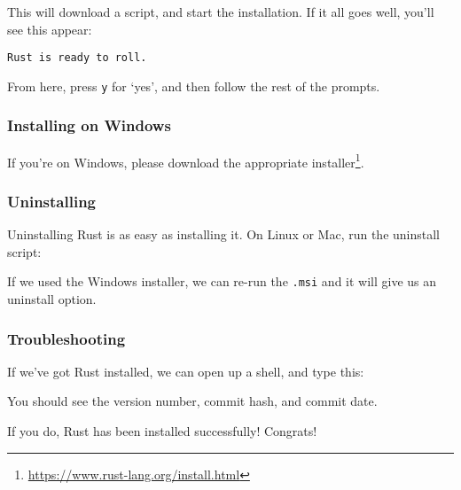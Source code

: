 \documentclass[a4paper,]{book}
\newenvironment{Shaded}{\begin{snugshade}}{\end{snugshade}}
\newcommand{\KeywordTok}[1]{\textcolor[rgb]{0.13,0.29,0.53}{\textbf{{#1}}}}
\newcommand{\NormalTok}[1]{{#1}}
\renewcommand{\href}[2]{#2\footnote{\url{#1}}}
\begin{document}
This will download a script, and start the installation. If it all goes
well, you'll see this appear:

\begin{verbatim}
Rust is ready to roll.
\end{verbatim}

From here, press \texttt{y} for `yes', and then follow the rest of the
prompts.

\subsubsection{Installing on Windows}\label{installing-on-windows}

If you're on Windows, please download the appropriate
\href{https://www.rust-lang.org/install.html}{installer}.

\subsubsection{Uninstalling}\label{uninstalling}

Uninstalling Rust is as easy as installing it. On Linux or Mac, run the
uninstall script:

\begin{Shaded}
\end{Shaded}

If we used the Windows installer, we can re-run the \texttt{.msi} and it
will give us an uninstall option.

\subsubsection{Troubleshooting}\label{troubleshooting}

If we've got Rust installed, we can open up a shell, and type this:

\begin{Shaded}
\end{Shaded}

You should see the version number, commit hash, and commit date.

If you do, Rust has been installed successfully! Congrats!
\end{document}
